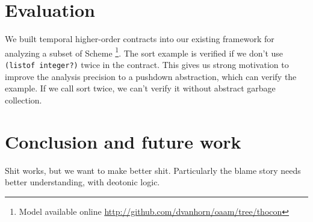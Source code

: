 \section{Evaluation}

We built temporal higher-order contracts into our existing framework for analyzing a subset of Scheme \footnote{Model available online \url{http://github.com/dvanhorn/oaam/tree/thocon}}.
%
The sort example is verified if we don't use \texttt{(listof integer?)} twice in the contract.
%
This gives us strong motivation to improve the analysis precision to a pushdown abstraction, which can verify the example.
%
If we call sort twice, we can't verify it without abstract garbage collection.

\section{Conclusion and future work} \label{sec:conclusion}

Shit works, but we want to make better shit.
%
Particularly the blame story needs better understanding, with deotonic logic.
